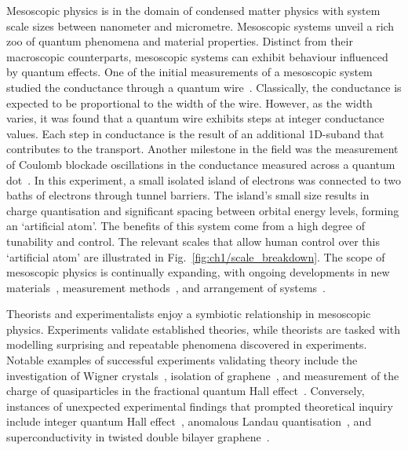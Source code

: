 \noindent Mesoscopic physics is in the domain of condensed matter physics with system scale sizes between nanometer and micrometre. Mesoscopic systems unveil a rich zoo of quantum phenomena and material properties. 
Distinct from their macroscopic counterparts, mesoscopic systems can exhibit behaviour influenced by quantum effects. One of the initial measurements of a mesoscopic system studied the conductance through a quantum wire~\cite{qpc_first_measurement, qpc_second_measurement}. 
Classically, the conductance is expected to be proportional to the width of the wire. 
However, as the width varies, it was found that a quantum wire exhibits steps at integer conductance values. Each step in conductance 
is the result of an additional 1D-suband that contributes to the transport. Another milestone in the field was the measurement of Coulomb blockade oscillations in the conductance measured across a quantum dot~\cite{first_charging_of_qd}. 
In this experiment, a small isolated island of electrons was connected to two baths of electrons through tunnel barriers. 
The island's small size results in charge quantisation and significant spacing between orbital energy levels, forming an `artificial atom'. 
The benefits of this system come from a high degree of tunability and control. The relevant scales that allow human control over this `artificial atom' are illustrated in Fig.~\ref{fig:ch1/scale_breakdown}.
The scope of mesoscopic physics is continually expanding, with ongoing developments in new materials~\cite{manfra_inas}, measurement methods~\cite{child_meas}, and arrangement of systems~\cite{borsoi2022shared, raysu}.

Theorists and experimentalists enjoy a symbiotic relationship in mesoscopic physics. Experiments validate established theories, while theorists are tasked with modelling surprising and repeatable phenomena discovered in experiments. Notable examples of successful experiments validating theory include the investigation of Wigner crystals~\cite{wigner_solid}, isolation of graphene~\cite{graphene}, and measurement of the charge of quasiparticles in the fractional quantum Hall effect~\cite{fractional_charge}. Conversely, instances of unexpected experimental findings that prompted theoretical inquiry include integer quantum Hall effect~\cite{klitzing}, anomalous Landau quantisation~\cite{landau_quantisation}, and superconductivity in twisted double bilayer graphene~\cite{raysu}.


